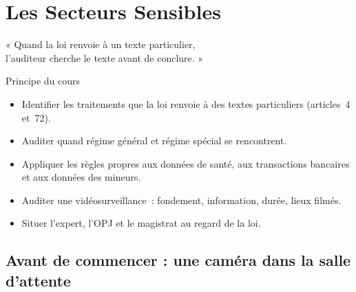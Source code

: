 
\chapter{Les Secteurs Sensibles}
\label{chap:secteurs}

\epigraph{%
    « Quand la loi renvoie à un texte particulier,\\
    l'auditeur cherche le texte avant de conclure. »%
}{Principe du cours}


\begin{boxobjectifs}
\begin{itemize}
    \item Identifier les traitements que la loi renvoie à des textes
          particuliers (articles~4 et~72).
    \item Auditer quand régime général et régime spécial se rencontrent.
    \item Appliquer les règles propres aux données de santé, aux
          transactions bancaires et aux données des mineurs.
    \item Auditer une vidéosurveillance~: fondement, information, durée,
          lieux filmés.
    \item Situer l'expert, l'OPJ et le magistrat au regard de la loi.
\end{itemize}
\end{boxobjectifs}

\bigskip

\section*{Avant de commencer : une caméra dans la salle d'attente}

